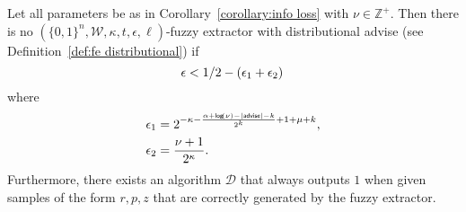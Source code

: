 \begin{lemma}
\label{lem:convert distinguisher}
Let all parameters be as in Corollary~\ref{corollary:info loss} with $\nu \in\mathbb{Z}^+$.  Then there is no $(\{0,1\}^n, \mathcal{W}, \kappa, t, \epsilon, \ell)$-fuzzy extractor with distributional advise (see Definition~\ref{def:fe distributional}) if
\[
\epsilon<1/2-\left(\epsilon_1+\epsilon_2\right)\\
\]
where 
\begin{align*}
\epsilon_1&= 2^{-\kappa-\frac{\alpha+\mathsf{log}\!\left(\nu\right)-|{\mathsf{advise}}|-k}{2^k}+1+\mu+k},\\
\epsilon_2&=\frac{\nu+1}{2^{\kappa}}.
\end{align*}
Furthermore, there exists an algorithm $\mathcal{D}$ that always outputs $1$ when given samples of the form $r, p, z$ that are correctly generated by the fuzzy extractor.
\end{lemma}
